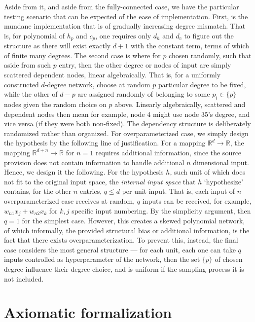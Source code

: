 \documentclass[10pt]{article} %
\begin{document}
Aside from it, and aside from the fully-connected case, we have the particular testing scenario that can be expected of the ease of implementation. First, is the mundane implementation that is of gradually increasing degree mismatch. That is, for polynomial of $h_{p}$ and $c_{p}$, one requires only $d_{h}$ and $d_{c}$ to figure out the structure as there will exist exactly $d+1$ with the constant term, terms of which of finite many degrees. The second case is where for $p$ chosen randomly, such that aside from such $p$ entry, then the other degree or nodes of input are simply scattered dependent nodes, linear algebraically. That is, for a uniformly constructed $d$-degree network, choose at random $p$ particular degree to be fixed, while the other of $d-p$ are assigned randomly of belonging to some $p_{i}\in \{p\}$ nodes given the random choice on $p$ above. Linearly algebraically, scattered and dependent nodes then mean for example, node $4$ might use node $35$'s degree, and vice versa (if they were both non-fixed). The dependency structure is deliberately randomized rather than organized. For overparameterized case, we simply design the hypothesis by the following line of justification. For a mapping $\mathbb{R}^{d}\to\mathbb{R}$, the mapping $\mathbb{R}^{d+n}\to \mathbb{R}$ for $n= 1$ requires additional information, since the source provision does not contain information to handle additional $n$ dimensional input. Hence, we design it the following. For the hypothesis $h$, such unit of which does not fit to the original input space, the \textit{internal input space} that $h$ `hypothesize' contains, for the other $n$ entries, $q\leq d$ per unit input. That is, each input of $n$ overparameterized case receives at random, $q$ inputs can be received, for example, $w_{n1}x_{j}+w_{n2}x_{k}$ for $k,j$ specific input numbering. By the simplicity argument, then $q=1$ for the simplest case. However, this creates a skewed polynomial network, of which informally, the provided structural bias or additional information, is the fact that there exists overparameterization. To prevent this, instead, the final case considers the most general structure --- for each unit, each one can take $q$ inputs controlled as hyperparameter of the network, then the set $\{p\}$ of chosen degree influence their degree choice, and is uniform if the sampling process it is not included. 



\clearpage

\section{Axiomatic formalization}
\end{document}
